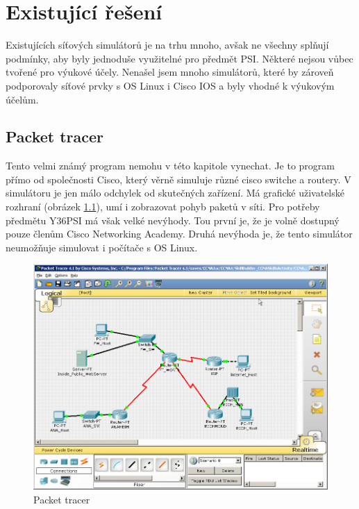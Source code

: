 \chapter{Existující řešení}

Existujících síťových simulátorů je na trhu mnoho, avšak ne všechny splňují podmínky, aby byly jednoduše využitelné pro předmět PSI. Některé nejsou vůbec tvořené pro výukové účely. Nenašel jsem mnoho simulátorů, které by zároveň podporovaly síťové prvky s OS Linux i Cisco IOS a byly vhodné k výukovým účelům.




\section{Packet tracer}

Tento velmi známý program nemohu v této kapitole vynechat. Je to program přímo od společnosti Cisco, který věrně simuluje různé cisco switche a routery. V simulátoru je jen málo odchylek od skutečných zařízení\cite{wiki:packetTracer}. Má grafické uživatelské rozhraní (obrázek \ref{obr_packet-tracer}), umí i zobrazovat pohyb paketů v síti. Pro potřeby předmětu Y36PSI má však velké nevýhody. Tou první je, že je volně dostupný pouze členům Cisco Networking Academy. Druhá nevýhoda je, že tento simulátor neumožňuje simulovat i počítače s OS Linux.

\begin{figure}[h]
\begin{center}
\includegraphics[width=12cm]{obrazky/packet-tracer}
\caption{Packet tracer}
\label{obr_packet-tracer}
\end{center}
\end{figure}




